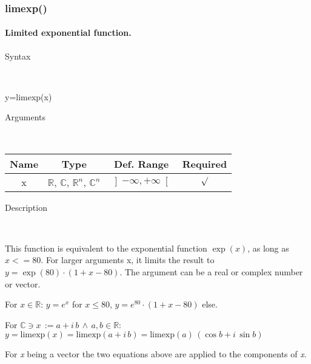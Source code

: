 \newpage
\subsubsection*{\hypertarget{limexp}{}{\Large limexp()}}


\paragraph{\label{par:Limited-Exponential-function}Limited exponential function.}

\begin{description}
\item [Syntax]~
\end{description}
y=limexp(x)

\begin{description}
\item [Arguments]~
\end{description}
\begin{tabular}{|c|c|c|c|}
\hline 
Name&
Type&
Def. Range&
Required\tabularnewline
\hline
\hline 
x&
$\mathbb{R}$, $\mathbb{C}$, $\mathbb{R}^{n}$, $\mathbb{C}^{n}$&
$\left]-\infty,+\infty\right[$&
$\surd$\tabularnewline
\hline
\end{tabular}

\begin{description}
\item [Description]~
\end{description}
This function is equivalent to the exponential function $\exp(x)$, as long as
$x<=80$. For larger arguments x, it limits the result to
$y=\exp(80)\cdot(1+x-80)$.
The argument can be a real or complex number or vector.

\medskip{}
For $x\in\mathbb{R}$: $y=e^{x}$ for $x\leq 80$, $y=e^{80}\cdot\left(1+x-80\right)$ else. 
\medskip{}

For $\mathbb{\mathbb{C}}\ni x\,:=a+i\, b\,\wedge\, a,b\in\mathbb{R}$:
$y=\textrm{limexp}\left(x\right)=\textrm{limexp}\left({a+i\, b}\right)=\textrm{limexp}\left(a\right)\,\left(\cos b+i\,\sin b\right)$
\medskip{}

For \textit{x} being a vector the two equations above are
applied to the components of \textit{x}.

